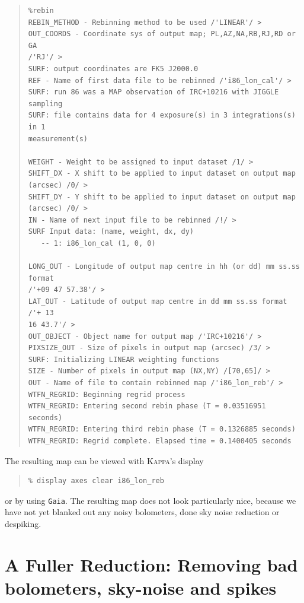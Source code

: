 \documentclass[twoside,11pt]{article}
\newenvironment{myquote}{\begin{quote}\begin{small}}{\end{small}\end{quote}}
\newcommand{\Kappa}{\xref{\textsc{Kappa}}{sun95}{}}
\newcommand{\task}[1]{\textsf{#1}}
\newcommand{\display}{\xref{\task{display}}{sun95}{DISPLAY}}
\newcommand{\xref}[3]{#1}
\newcommand{\xlabel}[1]{}
\renewcommand{\_}{\texttt{\symbol{95}}}
\begin{document}
\begin{myquote}
\begin{verbatim}
%rebin
REBIN_METHOD - Rebinning method to be used /'LINEAR'/ >
OUT_COORDS - Coordinate sys of output map; PL,AZ,NA,RB,RJ,RD or GA
/'RJ'/ >
SURF: output coordinates are FK5 J2000.0
REF - Name of first data file to be rebinned /'i86_lon_cal'/ >
SURF: run 86 was a MAP observation of IRC+10216 with JIGGLE sampling
SURF: file contains data for 4 exposure(s) in 3 integrations(s) in 1
measurement(s)

WEIGHT - Weight to be assigned to input dataset /1/ >
SHIFT_DX - X shift to be applied to input dataset on output map
(arcsec) /0/ >
SHIFT_DY - Y shift to be applied to input dataset on output map
(arcsec) /0/ >
IN - Name of next input file to be rebinned /!/ >
SURF Input data: (name, weight, dx, dy)
   -- 1: i86_lon_cal (1, 0, 0)

LONG_OUT - Longitude of output map centre in hh (or dd) mm ss.ss
format
/'+09 47 57.38'/ >
LAT_OUT - Latitude of output map centre in dd mm ss.ss format /'+ 13
16 43.7'/ >
OUT_OBJECT - Object name for output map /'IRC+10216'/ >
PIXSIZE_OUT - Size of pixels in output map (arcsec) /3/ >
SURF: Initializing LINEAR weighting functions
SIZE - Number of pixels in output map (NX,NY) /[70,65]/ >
OUT - Name of file to contain rebinned map /'i86_lon_reb'/ >
WTFN_REGRID: Beginning regrid process
WTFN_REGRID: Entering second rebin phase (T = 0.03516951 seconds)
WTFN_REGRID: Entering third rebin phase (T = 0.1326885 seconds)
WTFN_REGRID: Regrid complete. Elapsed time = 0.1400405 seconds
\end{verbatim}
\end{myquote}

The resulting map can be viewed with \Kappa's \display

\begin{myquote}
\begin{verbatim}
% display axes clear i86_lon_reb
\end{verbatim}
\end{myquote}

or by using \texttt{Gaia}.  The resulting map does not look
particularly nice, because we have not yet blanked out any noisy
bolometers, done sky noise reduction or despiking.



\section{\xlabel{Fuller_reduct}A Fuller Reduction: Removing bad
bolometers, sky-noise and spikes}
\end{document}
